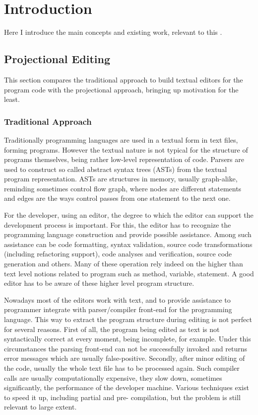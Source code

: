 \chapter{Introduction}
\label{chapter:Introduction}

Here I introduce the main concepts and existing work, relevant to this \MT.

 
\section{Projectional Editing}

This section compares the traditional approach to build textual editors for the program code with
the projectional approach, bringing up  motivation for the least.

\subsection{Traditional Approach}
Traditionally programming languages are used in a textual form in text files, forming programs.
However the textual nature is not typical for the structure of programs themselves, being rather low-level
representation of code. Parsers are used to construct so called abstract syntax trees (ASTs) from the textual 
program representation. ASTs are structures in memory, usually graph-alike, reminding sometimes control flow
graph, where nodes are different statements and edges are the ways control passes from one statement to the 
next one.

For the developer, using an editor, the degree to which the editor can support the development process is 
important. For this, the editor has to recognize the programming language construction and provide possible assistance.
Among such assistance can be code formatting, syntax validation, source code transformations (including refactoring support), code analyses and verification, 
source code generation and others. Many of these operation rely indeed on the higher than text level notions related to program such as method,
variable, statement. A good editor has to be aware of these higher level program structure.

Nowadays most of the editors work with text, and to provide assistance to programmer integrate with parser/compiler front-end 
for the programming language. This way to extract the program structure during editing is not perfect for several reasons.
First of all, the program being edited as text is not syntactically correct at every moment, being incomplete, for 
example. Under this circumstances the parsing front-end can not be successfully invoked and returns error messages
which are usually false-positive. Secondly, after minor editing of the code, usually the whole text file has to be
processed again. Such compiler calls are usually computationally expensive, they slow down, sometimes significantly, 
the performance of the developer machine. Various techniques exist to speed it up, including partial and pre- compilation,
but the problem is still relevant to large extent. 

